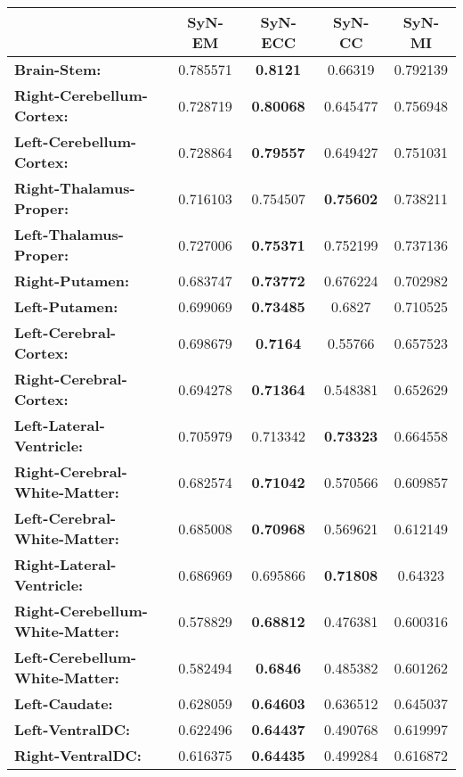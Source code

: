 \begin{table}[htbp]
  \centering
  {\small
    \begin{tabular}{lcccc}
    \toprule
          & \textbf{SyN-EM} & \textbf{SyN-ECC} & \textbf{SyN-CC} & \textbf{SyN-MI} \\
    \midrule
    \textbf{Brain-Stem:} & 0.785571 & \textbf{0.8121} & 0.66319 & 0.792139 \\
    \textbf{Right-Cerebellum-Cortex:} & 0.728719 & \textbf{0.80068} & 0.645477 & 0.756948 \\
    \textbf{Left-Cerebellum-Cortex:} & 0.728864 & \textbf{0.79557} & 0.649427 & 0.751031 \\
    \textbf{Right-Thalamus-Proper:} & 0.716103 & 0.754507 & \textbf{0.75602} & 0.738211 \\
    \textbf{Left-Thalamus-Proper:} & 0.727006 & \textbf{0.75371} & 0.752199 & 0.737136 \\
    \textbf{Right-Putamen:} & 0.683747 & \textbf{0.73772} & 0.676224 & 0.702982 \\
    \textbf{Left-Putamen:} & 0.699069 & \textbf{0.73485} & 0.6827 & 0.710525 \\
    \textbf{Left-Cerebral-Cortex:} & 0.698679 & \textbf{0.7164} & 0.55766 & 0.657523 \\
    \textbf{Right-Cerebral-Cortex:} & 0.694278 & \textbf{0.71364} & 0.548381 & 0.652629 \\
    \textbf{Left-Lateral-Ventricle:} & 0.705979 & 0.713342 & \textbf{0.73323} & 0.664558 \\
    \textbf{Right-Cerebral-White-Matter:} & 0.682574 & \textbf{0.71042} & 0.570566 & 0.609857 \\
    \textbf{Left-Cerebral-White-Matter:} & 0.685008 & \textbf{0.70968} & 0.569621 & 0.612149 \\
    \textbf{Right-Lateral-Ventricle:} & 0.686969 & 0.695866 & \textbf{0.71808} & 0.64323 \\
    \textbf{Right-Cerebellum-White-Matter:} & 0.578829 & \textbf{0.68812} & 0.476381 & 0.600316 \\
    \textbf{Left-Cerebellum-White-Matter:} & 0.582494 & \textbf{0.6846} & 0.485382 & 0.601262 \\
    \textbf{Left-Caudate:} & 0.628059 & \textbf{0.64603} & 0.636512 & 0.645037 \\
    \textbf{Left-VentralDC:} & 0.622496 & \textbf{0.64437} & 0.490768 & 0.619997 \\
    \textbf{Right-VentralDC:} & 0.616375 & \textbf{0.64435} & 0.499284 & 0.616872 \\

\end{tabular}}
\end{table}
